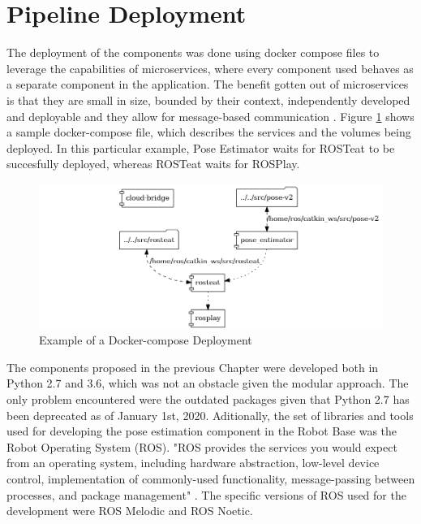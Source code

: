 \newpage
\section{Pipeline Deployment}\label{chap:4:deployment}
The deployment of the components was done using docker compose files to leverage the capabilities of microservices, where every component used behaves as a separate component in the application. The benefit gotten out of microservices is that they are small in size, bounded by their context, independently developed and deployable and they allow for message-based communication%
. 
Figure \ref{fig:cow_docker_topology} shows a sample docker-compose file, which describes the services and the volumes being deployed. In this particular example, Pose Estimator waits for ROSTeat to be succesfully deployed, whereas ROSTeat waits for ROSPlay.

\begin{figure}[h]
    \centering
    \includegraphics[width=1\textwidth]{images/cow_docker_topology.png}
    \caption{Example of a Docker-compose Deployment}
    \label{fig:cow_docker_topology}
\end{figure}

The components proposed in the previous Chapter were developed both in Python 2.7 and 3.6, which was not an obstacle given the modular approach. The only problem encountered were the outdated packages given that Python 2.7 has been deprecated as of January 1st, 2020. 
Aditionally, the set of libraries and tools used for developing the pose estimation component in the Robot Base was the Robot Operating System (ROS). "ROS provides the services you would expect from an operating system, including hardware abstraction, low-level device control, implementation of commonly-used functionality, message-passing between processes, and package management" \cite{2020ROS}. The specific versions of ROS used for the development were ROS Melodic and ROS Noetic.


